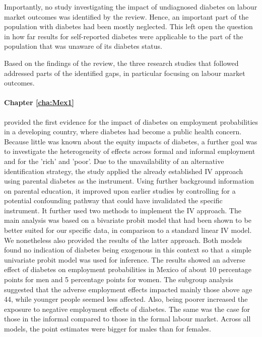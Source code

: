 Importantly, no study investigating the impact of undiagnosed diabetes on labour market outcomes was identified by the review. Hence, an important part of the population with diabetes had been mostly neglected. This left open the question in how far results for self-reported diabetes were applicable to the part of the population that was unaware of its diabetes status.

Based on the findings of the review, the three research studies that followed addressed parts of the identified gaps, in particular focusing on labour market outcomes. 

\paragraph{Chapter \ref{cha:Mex1}} provided the first evidence for the impact of diabetes on employment probabilities in a developing country, where diabetes had become a public health concern. Because little was known about the equity impacts of diabetes, a further goal was to investigate the heterogeneity of effects across formal and informal employment and for the 'rich' and 'poor'. Due to the unavailability of an alternative identification strategy, the study applied the already established \ac{IV} approach using parental diabetes as the instrument. Using further background information on parental education, it improved upon earlier studies by controlling for a potential confounding pathway that could have invalidated the specific instrument. It further used two methods to implement the \ac{IV} approach. The main analysis was based on a bivariate probit model that had been shown to be better suited for our specific data, in comparison to a standard linear \ac{IV} model. We nonetheless also provided the results of the latter approach. Both models found no indication of diabetes being exogenous in this context so that a simple univariate probit model was used for inference. The results showed an adverse effect of diabetes on employment probabilities in Mexico of about 10 percentage points for men and 5 percentage points for women. The subgroup analysis suggested that the adverse employment effects impacted mainly those above age 44, while younger people seemed less affected. Also, being poorer increased the exposure to negative employment effects of diabetes. The same was the case for those in the informal compared to those in the formal labour market. Across all models, the point estimates were bigger for males than for females. 

